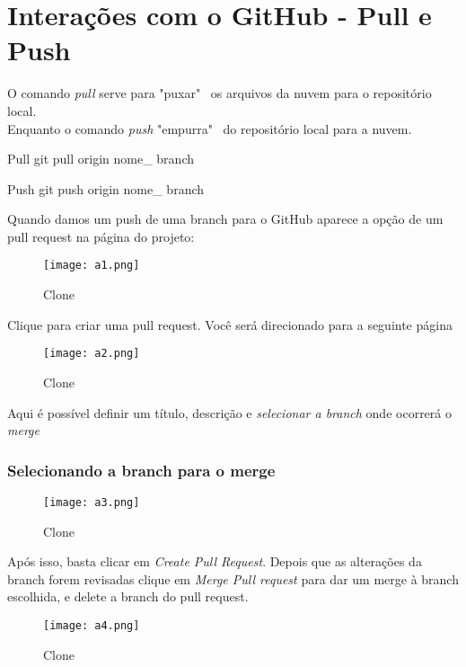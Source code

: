 \documentclass[aspectratio=169]{beamer}
\begin{document}
\section{Interações com o GitHub - Pull e Push}
\begin{frame}{\insertsectionhead}
	O comando \textit{pull} serve para "puxar" \ os arquivos da nuvem para o repositório local.\\
	Enquanto o comando \textit{push} "empurra" \ do repositório local para a nuvem.
	\begin{block}{Pull}
		git pull origin nome\_ branch
\end{block}	 
	\begin{block}{Push}
		git push origin nome\_ branch
	\end{block}
\end{frame}
\begin{frame}
	Quando damos um push de uma branch para o GitHub aparece a opção de um pull request na página do projeto:
	\begin{figure}
		\centering
		\texttt{[image: a1.png]}
		\caption{Clone}
	\end{figure}
\end{frame}
\begin{frame}
	Clique para criar uma pull request. Você será direcionado para a seguinte página
	\begin{figure}
		\centering
		\texttt{[image: a2.png]}
		\caption{Clone}
	\end{figure}
	Aqui é possível definir um título, descrição e \textit{selecionar a branch} onde ocorrerá o \textit{merge}
\end{frame}
\begin{frame}
	\frametitle{Selecionando a branch para o merge}
	\begin{figure}
		\centering
		\texttt{[image: a3.png]}
		\caption{Clone}
	\end{figure}
\end{frame}
\begin{frame}
	Após isso, basta clicar em \textit{Create Pull Request}.
	Depois que as alterações da branch forem revisadas clique em \textit{Merge Pull request} para dar um merge à branch escolhida, e delete a branch do pull request.
	\begin{figure}
		\centering
		\texttt{[image: a4.png]}
		\caption{Clone}
	\end{figure}
\end{frame}
\end{document}
